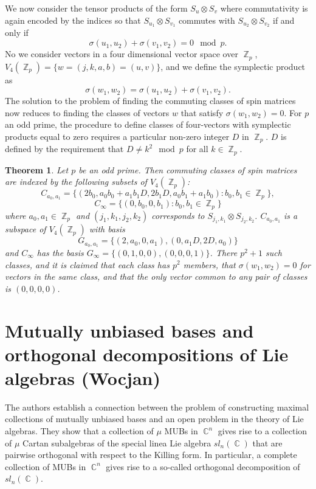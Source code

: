 \documentclass[a4paper]{article}
\DeclareMathOperator{\C}{\mathbb{C}}
\DeclareMathOperator{\Z}{\mathbb{Z}}
\newtheorem{theorem}{Theorem}
\begin{document}
  We now consider the tensor products of the form $S_u
  \otimes S_v$ where commutativity is again encoded by the
  indices so that $S_{u_1} \otimes S_{v_1}$ commutes with
  $S_{u_2} \otimes S_{v_2}$ if and only if
  \[
    \sigma(u_1,u_2) + \sigma(v_1,v_2) = 0 \mod p.
  \]
  No we consider vectors in a four dimensional vector space
  over $\Z_p$, $V_4(\Z_p) = \{w = (j,k,a,b) = (u,v)\}$, and
  we define the symplectic product as
  \[
    \sigma(w_1, w_2)
    = \sigma(u_1,u_2) + \sigma(v_1,v_2).
  \] 
  The solution to the problem of finding the commuting
  classes of spin matrices now reduces to finding the
  classes of vectors $w$ that satisfy $\sigma(w_1,w_2) = 0$.
  For $p$ an odd prime, the procedure to define classes of
  four-vectors with symplectic products equal to zero
  requires a particular non-zero integer $D$ in $\Z_p$. $D$ 
  is defined by the requirement that $D \neq k^2 \mod p$ for
  all $k \in \Z_p$.

  \begin{theorem}
    Let $p$ be an odd prime. Then commuting classes of spin
    matrices are indexed by the following subsets of
    $V_4(\Z_p)$:
    \[
      C_{a_0,a_1}
      = \{(2b_0,a_0b_0+a_1b_1D, 2b_1D, a_0b_1+a_1b_0) :
      b_0,b_1 \in \Z_p\},
    \] 
    \[
      C_\infty = \{(0,b_0,0,b_1) : b_0,b_1 \in \Z_p\}
    \] 
    where $a_0,a_1 \in \Z_p$ and $(j_1,k_1,j_2,k_2)$ 
    corresponds to $S_{j_1,k_1} \otimes S_{j_2,k_2}$.
    $C_{a_0,a_1}$ is a subspace of $V_4(\Z_p)$ with basis
    \[
      G_{a_0,a_1} = \{(2,a_0,0,a_1),(0,a_1D,2D,a_0)\}
    \] 
    and $C_\infty$ has the basis $G_\infty =
    \{(0,1,0,0),(0,0,0,1)\}$. There $p^2+1$ such classes,
    and it is claimed that each class has $p^2$ members,
    that $\sigma(w_1,w_2) = 0$ for vectors in the same
    class, and that the only vector common to any pair of
    classes is $(0,0,0,0)$. 
  \end{theorem}

  \section{Mutually unbiased bases and orthogonal
  decompositions of Lie algebras (Wocjan)}

  The authors establish a connection between the problem of
  constructing maximal collections of mutually unbiased
  bases and an open problem in the theory of Lie algebras.
  They show that a collection of $\mu$ MUBs in $\C^{n}$ 
  gives rise to a collection of $\mu$ Cartan subalgebras of
  the special linea Lie algebra $sl_n(\C)$ that are pairwise
  orthogonal with respect to the Killing form. In
  particular, a complete collection of MUBs in $\C^{n}$ 
  gives rise to a so-called orthogonal decomposition of
  $sl_n(\C)$.
\end{document}

